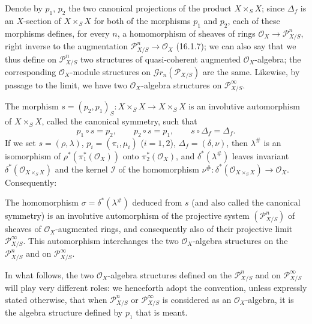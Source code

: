 \begin{env}[16.3.2]
\label{IV.16.3.2}
Denote by $p_1$, $p_2$ the two canonical projections of the product $X\times_S X$;
since $\Delta_f$ is an $X$-section of $X\times_S X$ for both of the
morphisms $p_1$ and $p_2$, each of these morphisms defines, for every $n$, a
homomorphism of sheaves of rings $\mathcal{O}_X\to\mathscr{P}_{X/S}^n$,
right inverse to the augmentation $\mathscr{P}_{X/S}^n\to\mathcal{O}_X$
(16.1.7); we can also say that we thus define on
$\mathscr{P}_{X/S}^n$ two structures of quasi-coherent augmented
$\mathcal{O}_X$-algebra; the corresponding $\mathcal{O}_X$-module structures on
$\mathscr{G}r_n(\mathscr{P}_{X/S})$ are the same. Likewise, by passage to
the limit, we have two $\mathcal{O}_X$-algebra structures on
$\mathscr{P}_{X/S}^\infty$.
\end{env}

\begin{env}[16.3.3]\label{IV.16.3.3}
The morphism $s=(p_2,p_1)_S:X\times_S X\to X\times_S X$ is an involutive
automorphism of $X\times_S X$, called the canonical symmetry, such that
\[
  p_1\circ s=p_2,\qquad p_2\circ s=p_1,\qquad s\circ\Delta_f=\Delta_f.
  \tag{16.3.3.1}
  \label{IV.16.3.3.1}
\]
If we set $s=(\rho,\lambda)$, $p_i=(\pi_i,\mu_i)$ ($i=1,2$),
$\Delta_f=(\delta,\nu)$, then $\lambda^\#$ is an isomorphism of
$\rho^*(\pi_1^*(\mathcal{O}_X))$ onto $\pi_2^*(\mathcal{O}_X)$, and
$\delta^*(\lambda^\#)$ leaves invariant $\delta^*(\mathcal{O}_{X\times_S X})$
and the kernel $\mathscr{I}$ of the homomorphism
$\nu^\#:\delta^*(\mathcal{O}_{X\times_S X})\to\mathcal{O}_X$. Consequently:
\end{env}

\begin{proposition}[16.3.4]\label{IV.16.3.4}
The homomorphism $\sigma=\delta^*(\lambda^\#)$ deduced from $s$ (and also called
the canonical symmetry) is an involutive automorphism of the projective system
$(\mathscr{P}_{X/S}^n)$ of sheaves
of $\mathcal{O}_X$-augmented rings, and consequently also of their projective limit
$\mathscr{P}_{X/S}^\infty$. This automorphism interchanges the two
$\mathcal{O}_X$-algebra structures on the $\mathscr{P}_{X/S}^n$ and on
$\mathscr{P}_{X/S}^\infty$.
\end{proposition}

\begin{env}[16.3.5]
\label{IV.16.3.5}
In what follows, the two $\mathcal{O}_X$-algebra structures defined on the
$\mathscr{P}_{X/S}^n$ and on $\mathscr{P}_{X/S}^\infty$ will play very
different roles: we henceforth adopt the convention, unless expressly stated
otherwise, that when $\mathscr{P}_{X/S}^n$ or $\mathscr{P}_{X/S}^\infty$ is
considered as an $\mathcal{O}_X$-algebra, it is the algebra structure defined by
$p_1$ that is meant.
\end{env}

